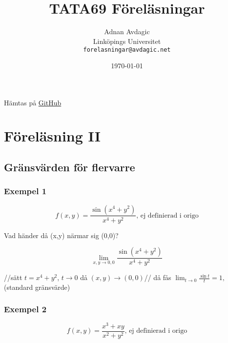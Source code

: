 \documentclass[a4paper]{article}
\title{TATA69 Föreläsningar}
\author{Adnan Avdagic\\
	Linköpings Universitet\\
	\texttt{forelasningar@avdagic.net}}
\date{\today}
\begin{document}
\hypersetup{pageanchor=false}
\begin{titlepage}
\maketitle
\begin{center}
Hämtas på \href{https://github.com/xR34ct/Lectures/tree/master/TATA69}{GitHub}
\end{center}
\thispagestyle{empty}
\end{titlepage}


\cleardoublepage
{}
\tableofcontents
\cleardoublepage
{}




\newpage
\hypersetup{pageanchor=true}
\cleardoublepage
\setcounter{page}{1}
\setcounter{section}{1}
\pagestyle{fancy}
\fancyhf{}
\rfoot{\rightmark}
\noindent
\section{Föreläsning II}
\subsection{Gränsvärden för flervarre}

\subsubsection{Exempel 1} \flushleft
\begin{equation} \label{eq:2.1}
	f(x,y) = \frac{\sin(x^4+y^2)}{x^4+y^2} \text{, ej definierad i origo}
\end{equation}

Vad händer då (x,y) närmar sig (0,0)?

$$\lim_{x,y \rightarrow 0,0} \frac{\sin(x^4+y^2)}{x^4+y^2}$$

//sätt $t= \displaystyle x^4+y^2$, ${t \rightarrow 0}$ då ${(x,y) \rightarrow (0,0)}$// \newline
då fås \(\displaystyle \lim_{t \rightarrow 0} \frac{\sin t}{t} = 1,\) (standard gränsvärde) \newline

\subsubsection{Exempel 2} \flushleft
\begin{equation} \label{eq:2.2}
	f(x,y) = \frac{x^3+xy}{x^2+y^2} \text{, ej definierad i origo}
\end{equation}
\end{document}
